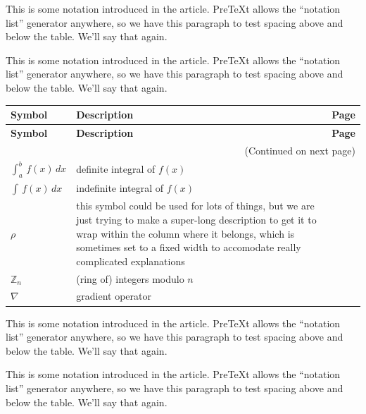 \documentclass{amsart}
\theoremstyle{plain}%
\theoremstyle{definition}%
\theoremstyle{remark}%
\numberwithin{equation}{section}
\begin{document}
\begin{appendices}%
%
%
%
\typeout{************************************************}
\typeout{************************************************}
%
\label{appendix-notation}%
This is some notation introduced in the article.  PreTeXt allows the ``notation list'' generator anywhere, so we have this paragraph to test spacing above and below the table.  We'll say that again.%
\par
This is some notation introduced in the article.  PreTeXt allows the ``notation list'' generator anywhere, so we have this paragraph to test spacing above and below the table.  We'll say that again.%
\begin{longtable}[l]{lp{}r}
\addtocounter{table}{-1}
\textbf{Symbol}&\textbf{Description}&\textbf{Page}\\[1em]
\endfirsthead
\textbf{Symbol}&\textbf{Description}&\textbf{Page}\\[1em]
\endhead
\multicolumn{3}{r}{(Continued on next page)}\\
\endfoot
\endlastfoot
\(\int_a^b\,f(x)\,dx\)&definite integral of \(f(x)\)&\pageref{section-introduction-2-5}\\
\(\int\,f(x)\,dx\)&indefinite integral of \(f(x)\)&\pageref{definition-indefinite-integral-3}\\
\(\rho\)&this symbol could be used for lots of things, but we are just trying to make a super-long description to get it to wrap within the column where it belongs, which is sometimes set to a fixed width to accomodate really complicated explanations&\pageref{derivatives-9-2-3}\\
\(\mathbb{Z}_n\)&(ring of) integers modulo \(n\)&\pageref{derivatives-9-2-11}\\
\(\nabla\)&gradient operator&\pageref{section-mathematics-3-3-3}\\
\end{longtable}
This is some notation introduced in the article.  PreTeXt allows the ``notation list'' generator anywhere, so we have this paragraph to test spacing above and below the table.  We'll say that again.%
\par
This is some notation introduced in the article.  PreTeXt allows the ``notation list'' generator anywhere, so we have this paragraph to test spacing above and below the table.  We'll say that again.%
%
%
\typeout{************************************************}
\typeout{************************************************}

\end{appendices}
\end{document}
